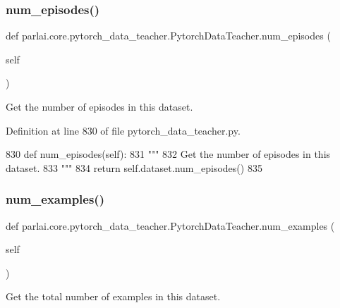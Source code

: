 \subsubsection{\texorpdfstring{num\+\_\+episodes()}{num\_episodes()}}
{\footnotesize\ttfamily def parlai.\+core.\+pytorch\+\_\+data\+\_\+teacher.\+Pytorch\+Data\+Teacher.\+num\+\_\+episodes (\begin{DoxyParamCaption}\item[{}]{self }\end{DoxyParamCaption})}

\begin{DoxyVerb}Get the number of episodes in this dataset.
\end{DoxyVerb}
 

Definition at line 830 of file pytorch\+\_\+data\+\_\+teacher.\+py.


\begin{DoxyCode}
830     \textcolor{keyword}{def }num\_episodes(self):
831         \textcolor{stringliteral}{"""}
832 \textcolor{stringliteral}{        Get the number of episodes in this dataset.}
833 \textcolor{stringliteral}{        """}
834         \textcolor{keywordflow}{return} self.dataset.num\_episodes()
835 
\end{DoxyCode}
\mbox{\label{classparlai_1_1core_1_1pytorch__data__teacher_1_1PytorchDataTeacher_a503206272b61d567903ea9bbb70a18c7}} 
\subsubsection{\texorpdfstring{num\+\_\+examples()}{num\_examples()}}
{\footnotesize\ttfamily def parlai.\+core.\+pytorch\+\_\+data\+\_\+teacher.\+Pytorch\+Data\+Teacher.\+num\+\_\+examples (\begin{DoxyParamCaption}\item[{}]{self }\end{DoxyParamCaption})}

\begin{DoxyVerb}Get the total number of examples in this dataset.
\end{DoxyVerb}
 

